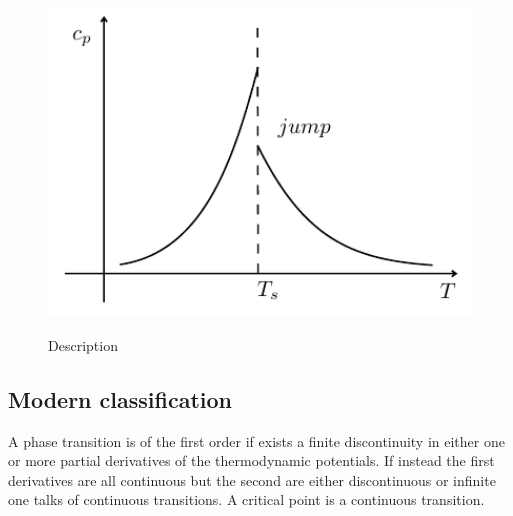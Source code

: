 \documentclass[../main/main.tex]{subfiles}
\begin{document}
\begin{figure}[h!]
\begin{minipage}[c]{0.5\linewidth}
{\includegraphics[width=1\textwidth]{../lessons/3_image/8.pdf}

    \label{fig:3_04_3} }
\end{minipage}
\begin{minipage}[]{0.5\linewidth}
\centering
{}
\end{minipage}
\caption{\label{fig:} Description}
\end{figure}

\subsection{Modern classification}
A phase transition is of the first order if exists a finite discontinuity in either one or more partial derivatives of the thermodynamic potentials. If instead the first derivatives are all continuous but the second are either discontinuous or infinite one talks of continuous transitions.
A critical point is a continuous transition.
\end{document}
